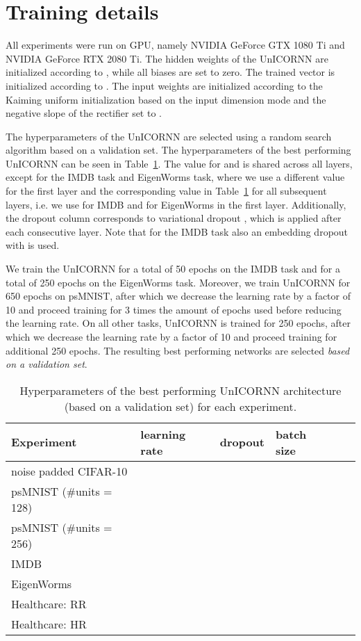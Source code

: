 \documentclass[a4paper]{article}
\newcommand{\Tref}[1]{Table~\ref{#1}}
\begin{document}
\section{Training details}
All experiments were run on GPU, namely NVIDIA GeForce GTX 1080 Ti and NVIDIA GeForce RTX 2080 Ti. The hidden weights  of the UnICORNN are initialized according to  , while all biases are set to zero. The trained vector  is initialized according to . The input weights  are initialized according to the Kaiming uniform initialization \citep{kaiming} based on the input dimension mode and the negative slope of the rectifier set to .

The hyperparameters of the UnICORNN are selected using a random search algorithm based on a validation set. The hyperparameters of the best performing UnICORNN can be seen in \Tref{tab:nets}. The value for  and  is shared across all layers, except for the IMDB task and EigenWorms task, where we use a different  value for the first layer and the corresponding  value in \Tref{tab:nets} for all subsequent layers, i.e. we use  for IMDB and  for EigenWorms in the first layer. 
Additionally, the dropout column corresponds to variational dropout \citep{gal}, which is applied after each consecutive layer. Note that for the IMDB task also an embedding dropout with  is used.

We train the UnICORNN for a total of 50 epochs on the IMDB task and for a total of 250 epochs on the EigenWorms task. Moreover, we train UnICORNN for 650 epochs on psMNIST, after which we decrease the learning rate by a factor of 10 and proceed training for 3 times the amount of epochs used before reducing the learning rate. On all other tasks, UnICORNN is trained for 250 epochs, after which we decrease the learning rate by a factor of 10 and proceed training for additional 250 epochs.
The resulting best performing networks are selected \emph{based on a validation set}.

\begin{table}[h!]
  \caption{Hyperparameters of the best performing UnICORNN architecture (based on a validation set) for each experiment.}
  \label{tab:nets}
  \centering
  \begin{tabular}{llllll}
    \toprule
    \cmidrule(r){1-6}
    Experiment & learning rate & dropout & batch size &  &  \\
    \midrule
    noise padded CIFAR-10 &  &  &  &  & \\
    psMNIST (\#units = 128) &  &  & &  & \\
    psMNIST (\#units = 256) &  &  &  &  &  \\
    IMDB &  &  &  &  & \\
    EigenWorms  &  &  &  &  &  \\
    Healthcare: RR  &  &  &  &  &  \\
    Healthcare: HR  &   &  &  &  &  \\
    

    \bottomrule
  \end{tabular}
\end{table}
\end{document}
